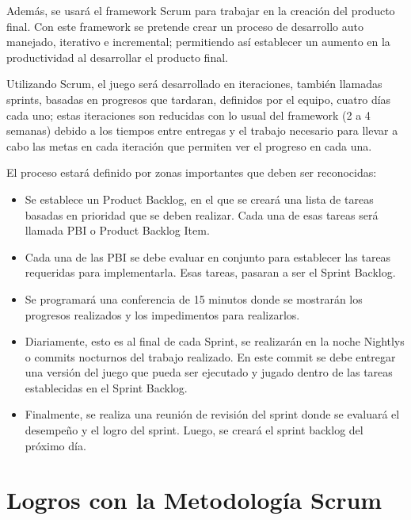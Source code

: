 \documentclass[letterpaper]{scrreprt}
\begin{document}
Además, se usará el framework Scrum para trabajar en la creación del producto final. Con este framework se pretende crear un proceso de desarrollo auto manejado, iterativo e incremental; permitiendo así establecer un aumento en la productividad al desarrollar el producto final.

Utilizando Scrum, el juego será desarrollado en iteraciones, también llamadas sprints, basadas en progresos que tardaran, definidos por el equipo, cuatro días cada uno; estas iteraciones son reducidas con lo usual del framework (2 a 4 semanas) debido a los tiempos entre entregas y el trabajo necesario para llevar a cabo las metas en cada iteración que permiten ver el progreso en cada una. 

El proceso estará definido por zonas importantes que deben ser reconocidas:
\begin{itemize}
	\item Se establece un Product Backlog, en el que se creará una lista de tareas basadas en prioridad que se deben realizar. Cada una de esas tareas será llamada PBI o Product Backlog Item.
	\item Cada una de las PBI se debe evaluar en conjunto para establecer las tareas requeridas para implementarla. Esas tareas, pasaran a ser el Sprint Backlog. 
	\item  Se programará una conferencia de 15 minutos donde se mostrarán los progresos realizados y los impedimentos para realizarlos.
	\item Diariamente, esto es al final de cada Sprint,  se realizarán en la noche Nightlys o commits nocturnos del trabajo realizado. En este commit se debe entregar una versión del juego que pueda ser ejecutado y jugado dentro de las tareas establecidas en el Sprint Backlog.
	\item Finalmente, se realiza una reunión de revisión del sprint donde se evaluará el desempeño y el logro del sprint. Luego, se creará el sprint backlog del próximo día.
	
\end{itemize}


\section{Logros con la Metodología Scrum}
\end{document}
